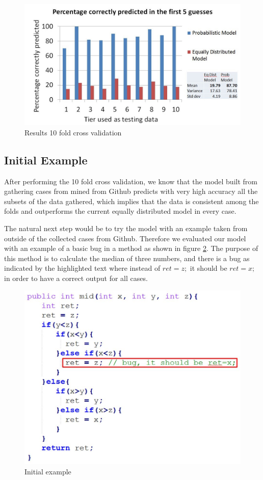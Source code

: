 \documentclass[conference]{IEEEtran}
\begin{document}
\begin{figure}[!h]
  \centering
    \includegraphics[scale=0.33]{sanity1}
  \caption{Results 10 fold cross validation}
  \label{fig:results10fcv}
\end{figure}

\subsection{Initial Example}
After performing the 10 fold cross validation, we know that the model built from 
gathering cases from mined from Github predicts with very high accuracy all the 
subsets of the data gathered, which implies that the data is consistent among 
the folds and outperforms the current equally distributed model in every case. 

The natural next step would be to try the model with an example taken from 
outside of the collected cases from Github. Therefore we evaluated our model 
with an example of a basic bug in a method as shown in figure 
\ref{fig:initialExample}. The purpose of this method is to calculate the median 
of three numbers, and there is a bug as indicated by the highlighted text where 
instead of $ret = z;$ it should be $ret = x;$ in order to have a correct output 
for all cases.

\begin{figure}[!h]
  \centering
    \includegraphics[scale=0.35]{sanity2}
  \caption{Initial example}
  \label{fig:initialExample}
\end{figure}
\end{document}
